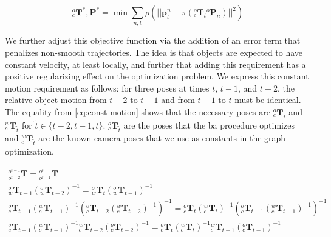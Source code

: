 \documentclass[headsepline, hidelinks, footsepline, footinclude=false, oneside, fontsize=11pt, paper=a4, listof=totoc, bibliography=totoc]{scrbook}
\begin{document}
\begin{equation}
\label{eq:ba-bamot}
    {}^{o}_{c}\mathbf{T}^*, \mathbf{P}^* = \min \sum_{n, t}\rho(||\mathbf{p}_{t}^{n} - \pi({}^{o}_{c}\mathbf{T}_{t}{}^{o}\mathbf{P}_{n})||^2)
\end{equation}

We further adjust this objective function via the addition of an error term that penalizes non-smooth trajectories. 
The idea is that objects are expected to have constant velocity, at least locally, and further that adding this requirement has a positive regularizing effect on the optimization problem. 
We express this constant motion requirement as follows: 
for three poses at times \(t\), \(t-1\), and \(t-2\), the relative object motion from \(t-2\) to \(t-1\) and from \(t-1\) to \(t\) must be identical.
The equality from \cref{eq:const-motion} shows that the necessary poses are \({}^{o}_{c}\mathbf{T}_{\tilde{t}}\) and \({}^{w}_{c}\mathbf{T}_{\tilde{t}}\) for \(\tilde{t} \in \{t-2, t-1, t\}\).
\({}^{o}_{c}\mathbf{T}_{\tilde{t}}\) are the poses that the \gls{ba} procedure optimizes and \({}^{w}_{c}\mathbf{T}_{\tilde{t}}\) are the known camera poses that we use as constants in the graph-optimization.

\begin{equation}
\label{eq:const-motion}
\begin{gathered}
{}^{o^{t-1}}_{o^{t-2}}\mathbf{T} = {}^{o^{t}}_{o^{t-1}}\mathbf{T} \\
{}^{o}_{w}\mathbf{T}_{t-1}({}^{o}_{w}\mathbf{T}_{t-2})^{-1} = {}^{o}_{w}\mathbf{T}_{t}({}^{o}_{w}\mathbf{T}_{t-1})^{-1} \\
{}^{o}_{c}\mathbf{T}_{t-1}({}^{w}_{c}\mathbf{T}_{t-1})^{-1}({}^{o}_{c}\mathbf{T}_{t-2}({}^{w}_{c}\mathbf{T}_{t-2})^{-1})^{-1} = 
{}^{o}_{c}\mathbf{T}_{t}({}^{w}_{c}\mathbf{T}_{t})^{-1}({}^{o}_{c}\mathbf{T}_{t-1}({}^{w}_{c}\mathbf{T}_{t-1})^{-1})^{-1} \\ 
{}^{o}_{c}\mathbf{T}_{t-1}({}^{w}_{c}\mathbf{T}_{t-1})^{-1}{}^{w}_{c}\mathbf{T}_{t-2}({}^{o}_{c}\mathbf{T}_{t-2})^{-1} = 
{}^{o}_{c}\mathbf{T}_{t}({}^{w}_{c}\mathbf{T}_{t})^{-1}{}^{w}_{c}\mathbf{T}_{t-1}({}^{o}_{c}\mathbf{T}_{t-1})^{-1} \\
\end{gathered}
\end{equation}
\end{document}
